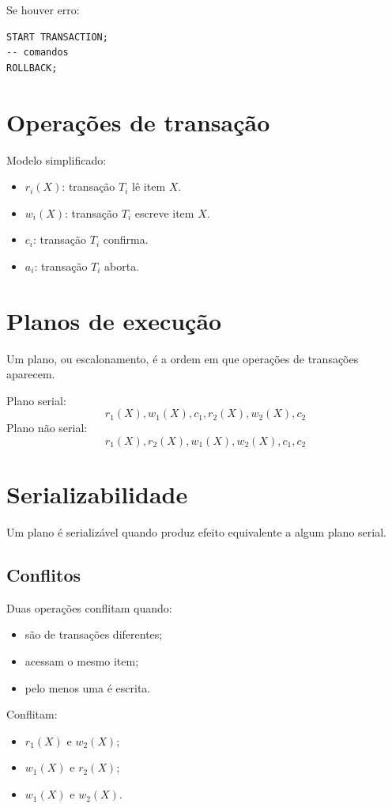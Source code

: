 \documentclass[12pt,a4paper]{article}
\begin{document}
Se houver erro:
\begin{verbatim}
START TRANSACTION;
-- comandos
ROLLBACK;
\end{verbatim}

\section{Operações de transação}
Modelo simplificado:
\begin{itemize}
    \item $r_i(X)$: transação $T_i$ lê item $X$.
    \item $w_i(X)$: transação $T_i$ escreve item $X$.
    \item $c_i$: transação $T_i$ confirma.
    \item $a_i$: transação $T_i$ aborta.
\end{itemize}

\section{Planos de execução}
Um plano, ou escalonamento, é a ordem em que operações de transações aparecem.

Plano serial:
\[
r_1(X), w_1(X), c_1, r_2(X), w_2(X), c_2
\]
Plano não serial:
\[
r_1(X), r_2(X), w_1(X), w_2(X), c_1, c_2
\]

\section{Serializabilidade}
Um plano é serializável quando produz efeito equivalente a algum plano serial.

\subsection{Conflitos}
Duas operações conflitam quando:
\begin{itemize}
    \item são de transações diferentes;
    \item acessam o mesmo item;
    \item pelo menos uma é escrita.
\end{itemize}

Conflitam:
\begin{itemize}
    \item $r_1(X)$ e $w_2(X)$;
    \item $w_1(X)$ e $r_2(X)$;
    \item $w_1(X)$ e $w_2(X)$.
\end{itemize}
\end{document}
